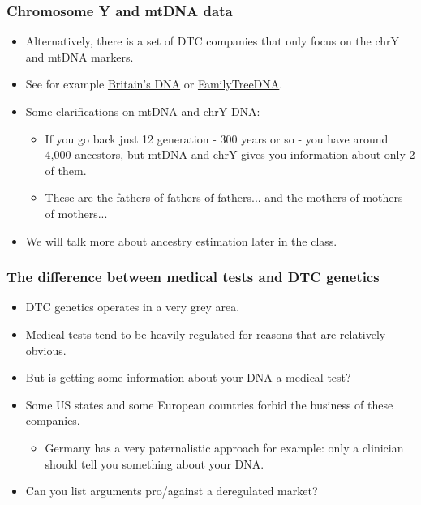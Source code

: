 \documentclass{beamer}
\begin{document}


\begin{frame}
  \frametitle{Chromosome Y and mtDNA data}
   \begin{itemize}
   \item Alternatively, there is a set of DTC companies that only focus on the chrY and mtDNA markers.
   \item See for example \href{http://www.britainsdna.com/}{Britain's DNA} or \href{http://www.familytreedna.com/}{FamilyTreeDNA}.
   \item Some clarifications on mtDNA and chrY DNA:
     \begin{itemize}
     \item If you go back just 12 generation - 300 years or so - you have around 4,000 ancestors, but mtDNA and chrY gives you information about only 2 of them.
     \item These are the fathers of fathers of fathers... and the mothers of mothers of mothers...
     \end{itemize}
   \item We will talk more about ancestry estimation later in the class.
   \end{itemize}
\end{frame}



\begin{frame}
  \frametitle{The difference between medical tests and DTC genetics}
  \begin{itemize}
  \item DTC genetics operates in a very grey area.
  \item Medical tests tend to be heavily regulated for reasons that are relatively obvious.
  \item But is getting some information about your DNA a medical test?
  \item Some US states and some European countries forbid the business of these companies.
    \begin{itemize}
    \item Germany has a very paternalistic approach for example: only a clinician should tell you something about your DNA.
    \end{itemize}
  \item Can you list arguments pro/against a deregulated market?
  \end{itemize}
\end{frame}
\end{document}
